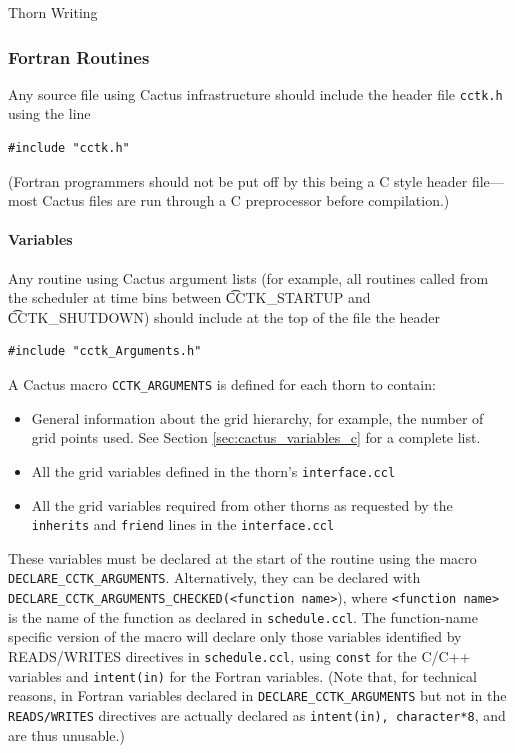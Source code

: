 \begin{cactuspart}{Thorn Writing}
\subsubsection{Fortran Routines}

Any source file using Cactus infrastructure should include
the header file \texttt{cctk.h} using the line
\begin{verbatim}
#include "cctk.h"
\end{verbatim}
(Fortran programmers should not be put off by this being a C style
header file---most Cactus files are run through a C preprocessor
before compilation.)

\paragraph{Variables}

Any routine using Cactus argument lists (for example, all routines called from
the scheduler at time bins between {\t CCTK\_STARTUP} and {\t CCTK\_SHUTDOWN})
should include at the top of the file the header
\begin{verbatim}
#include "cctk_Arguments.h"
\end{verbatim}

A Cactus macro \texttt{CCTK\_ARGUMENTS} is defined for each thorn
to contain:
\begin{itemize}
\item General information about the grid hierarchy, for example, the number
      of grid points used. See Section \ref{sec:cactus_variables_c} for a
      complete list.
\item All the grid variables defined in the thorn's \texttt{interface.ccl}
\item All the grid variables required from other thorns as requested by
      the \texttt{inherits} and \texttt{friend} lines in the \texttt{interface.ccl}
\end{itemize}
These variables must be declared at the start of the routine using
the macro \texttt{DECLARE\_CCTK\_ARGUMENTS}. Alternatively, they can
be declared with \texttt{DECLARE\_CCTK\_ARGUMENTS\_CHECKED(<function name>}),
where \texttt{<function name>} is the name of the function as declared
in \texttt{schedule.ccl}. The function-name specific version of the macro
will declare only those variables identified by READS/WRITES directives
in \texttt{schedule.ccl}, using \texttt{const} for the C/C++ variables
and \texttt{intent(in)} for the Fortran variables. (Note that, for technical
reasons, in Fortran variables declared in \texttt{DECLARE\_CCTK\_ARGUMENTS}
but not in the \texttt{READS/WRITES} directives are actually declared as
\texttt{intent(in), character*8}, and are thus unusable.)


\end{cactuspart}
